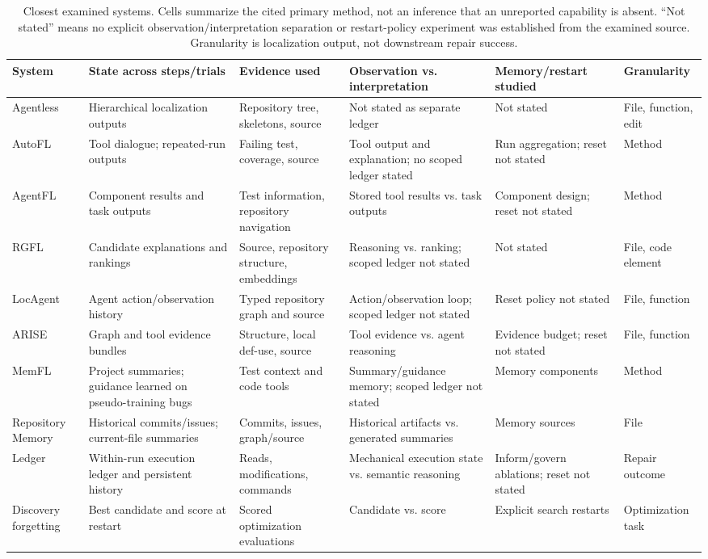 \documentclass[letterpaper,journal]{IEEEtran}
\begin{document}
\begin{table}[t]
\caption{Closest examined systems. Cells summarize the cited primary method, not an inference that an unreported capability is absent. ``Not stated'' means no explicit observation/interpretation separation or restart-policy experiment was established from the examined source. Granularity is localization output, not downstream repair success.}\label{tab:closest}
\centering\scriptsize\setlength{\tabcolsep}{2.5pt}
\begin{tabular}{@{}p{}p{}p{}p{}p{}p{}@{}}\toprule
System & State across steps/trials & Evidence used & Observation vs. interpretation & Memory/restart studied & Granularity\\\midrule
Agentless~\cite{agentless2025} & Hierarchical localization outputs & Repository tree, skeletons, source & Not stated as separate ledger & Not stated & File, function, edit\\
AutoFL~\cite{autofl2024} & Tool dialogue; repeated-run outputs & Failing test, coverage, source & Tool output and explanation; no scoped ledger stated & Run aggregation; reset not stated & Method\\
AgentFL~\cite{agentfl2024} & Component results and task outputs & Test information, repository navigation & Stored tool results vs. task outputs & Component design; reset not stated & Method\\
RGFL~\cite{rgfl2026} & Candidate explanations and rankings & Source, repository structure, embeddings & Reasoning vs. ranking; scoped ledger not stated & Not stated & File, code element\\
LocAgent~\cite{locagent2025} & Agent action/observation history & Typed repository graph and source & Action/observation loop; scoped ledger not stated & Reset policy not stated & File, function\\
ARISE~\cite{arise2026} & Graph and tool evidence bundles & Structure, local def-use, source & Tool evidence vs. agent reasoning & Evidence budget; reset not stated & File, function\\
MemFL~\cite{memfl2025} & Project summaries; guidance learned on pseudo-training bugs & Test context and code tools & Summary/guidance memory; scoped ledger not stated & Memory components & Method\\
Repository Memory~\cite{repomem2026} & Historical commits/issues; current-file summaries & Commits, issues, graph/source & Historical artifacts vs. generated summaries & Memory sources & File\\
Ledger~\cite{ledger2026} & Within-run execution ledger and persistent history & Reads, modifications, commands & Mechanical execution state vs. semantic reasoning & Inform/govern ablations; reset not stated & Repair outcome\\
Discovery forgetting~\cite{forgetting2026} & Best candidate and score at restart & Scored optimization evaluations & Candidate vs. score & Explicit search restarts & Optimization task\\
\bottomrule\end{tabular}
\end{table}
\end{document}
